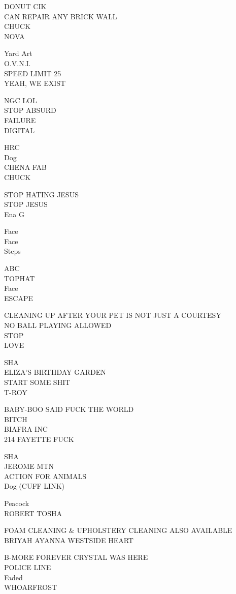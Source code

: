 \documentclass[10pt,letterpaper]{article}
\begin{document}
DONUT CIK\\
CAN REPAIR ANY BRICK WALL\\
CHUCK\\
NOVA

Yard Art\\
O.V.N.I.\\
SPEED LIMIT 25\\
YEAH, WE EXIST

NGC LOL\\
STOP ABSURD\\
FAILURE\\
DIGITAL

HRC\\
Dog\\
CHENA FAB\\
CHUCK

STOP HATING JESUS\\
STOP JESUS\\
Ena G

Face\\
Face\\
Steps

ABC\\
TOPHAT\\
Face\\
ESCAPE

CLEANING UP AFTER YOUR PET IS NOT JUST A COURTESY\\
NO BALL PLAYING ALLOWED\\
STOP\\
LOVE

SHA\\
ELIZA'S BIRTHDAY GARDEN\\
START SOME SHIT\\
T{-}ROY

BABY{-}BOO SAID FUCK THE WORLD\\
BITCH\\
BIAFRA INC\\
214 FAYETTE FUCK

SHA\\
JEROME MTN\\
ACTION FOR ANIMALS\\
Dog (CUFF LINK)

Peacock\\
ROBERT TOSHA

FOAM CLEANING \& UPHOLSTERY CLEANING ALSO AVAILABLE\\
BRIYAH AYANNA WESTSIDE HEART

B{-}MORE FOREVER CRYSTAL WAS HERE\\
POLICE LINE\\
Faded\\
WHOARFROST
\end{document}
